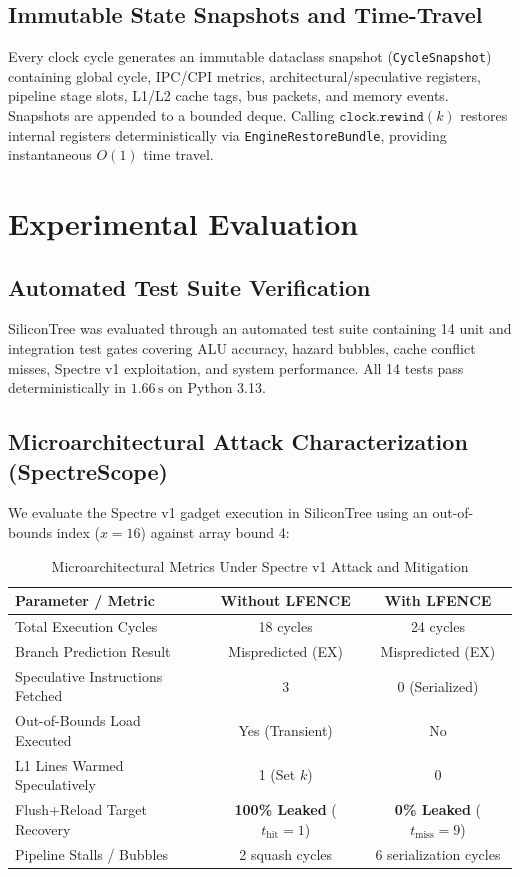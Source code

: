 \documentclass[journal,twocolumn,10pt]{IEEEtran}
\begin{document}
\subsection{Immutable State Snapshots and Time-Travel}
Every clock cycle generates an immutable dataclass snapshot (\texttt{CycleSnapshot}) containing global cycle, IPC/CPI metrics, architectural/speculative registers, pipeline stage slots, L1/L2 cache tags, bus packets, and memory events. Snapshots are appended to a bounded deque. Calling $\texttt{clock.rewind}(k)$ restores internal registers deterministically via \texttt{EngineRestoreBundle}, providing instantaneous $O(1)$ time travel.

\section{Experimental Evaluation}

\subsection{Automated Test Suite Verification}
SiliconTree was evaluated through an automated test suite containing 14 unit and integration test gates covering ALU accuracy, hazard bubbles, cache conflict misses, Spectre v1 exploitation, and system performance. All 14 tests pass deterministically in $1.66\,\text{s}$ on Python 3.13.

\subsection{Microarchitectural Attack Characterization (SpectreScope)}
We evaluate the Spectre v1 gadget execution in SiliconTree using an out-of-bounds index ($x=16$) against array bound 4:

\begin{table}[t]
\caption{Microarchitectural Metrics Under Spectre v1 Attack and Mitigation}
\label{tab:spectre}
\centering
\begin{tabular}{lcc}
\toprule
\textbf{Parameter / Metric} & \textbf{Without LFENCE} & \textbf{With LFENCE} \\
\midrule
Total Execution Cycles & 18 cycles & 24 cycles \\
Branch Prediction Result & Mispredicted (EX) & Mispredicted (EX) \\
Speculative Instructions Fetched & 3 & 0 (Serialized) \\
Out-of-Bounds Load Executed & Yes (Transient) & No \\
L1 Lines Warmed Speculatively & 1 (Set $k$) & 0 \\
Flush+Reload Target Recovery & \textbf{100\% Leaked} ($t_{\text{hit}}=1$) & \textbf{0\% Leaked} ($t_{\text{miss}}=9$) \\
Pipeline Stalls / Bubbles & 2 squash cycles & 6 serialization cycles \\
\bottomrule
\end{tabular}
\end{table}
\end{document}

